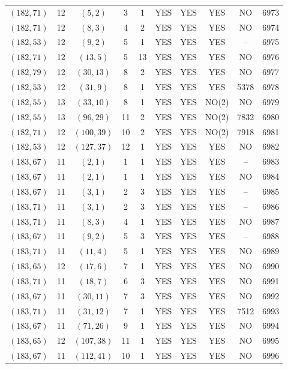 \begin{longtable}{|c|c|c|c|c|c|c|c|c|c|}
$(182, 71)$ & 12 & $(5, 2)$ & 3 & 1 & YES & YES & YES & NO & 6973\\
$(182, 71)$ & 12 & $(8, 3)$ & 4 & 2 & YES & YES & YES & NO & 6974\\
$(182, 53)$ & 12 & $(9, 2)$ & 5 & 1 & YES & YES & YES & -- & 6975\\
$(182, 71)$ & 12 & $(13, 5)$ & 5 & 13 & YES & YES & YES & NO & 6976\\
$(182, 79)$ & 12 & $(30, 13)$ & 8 & 2 & YES & YES & YES & NO & 6977\\
$(182, 53)$ & 12 & $(31, 9)$ & 8 & 1 & YES & YES & YES & 5378 & 6978\\
$(182, 55)$ & 13 & $(33, 10)$ & 8 & 1 & YES & YES & NO(2) & NO & 6979\\
$(182, 55)$ & 13 & $(96, 29)$ & 11 & 2 & YES & YES & NO(2) & 7832 & 6980\\
$(182, 71)$ & 12 & $(100, 39)$ & 10 & 2 & YES & YES & NO(2) & 7918 & 6981\\
$(182, 53)$ & 12 & $(127, 37)$ & 12 & 1 & YES & YES & YES & NO & 6982\\
$(183, 67)$ & 11 & $(2, 1)$ & 1 & 1 & YES & YES & YES & -- & 6983\\
$(183, 67)$ & 11 & $(2, 1)$ & 1 & 1 & YES & YES & YES & NO & 6984\\
$(183, 67)$ & 11 & $(3, 1)$ & 2 & 3 & YES & YES & YES & -- & 6985\\
$(183, 71)$ & 11 & $(3, 1)$ & 2 & 3 & YES & YES & YES & -- & 6986\\
$(183, 71)$ & 11 & $(8, 3)$ & 4 & 1 & YES & YES & YES & NO & 6987\\
$(183, 67)$ & 11 & $(9, 2)$ & 5 & 3 & YES & YES & YES & -- & 6988\\
$(183, 71)$ & 11 & $(11, 4)$ & 5 & 1 & YES & YES & YES & NO & 6989\\
$(183, 65)$ & 12 & $(17, 6)$ & 7 & 1 & YES & YES & YES & NO & 6990\\
$(183, 71)$ & 11 & $(18, 7)$ & 6 & 3 & YES & YES & YES & NO & 6991\\
$(183, 67)$ & 11 & $(30, 11)$ & 7 & 3 & YES & YES & YES & NO & 6992\\
$(183, 71)$ & 11 & $(31, 12)$ & 7 & 1 & YES & YES & YES & 7512 & 6993\\
$(183, 67)$ & 11 & $(71, 26)$ & 9 & 1 & YES & YES & YES & NO & 6994\\
$(183, 65)$ & 12 & $(107, 38)$ & 11 & 1 & YES & YES & YES & NO & 6995\\
$(183, 67)$ & 11 & $(112, 41)$ & 10 & 1 & YES & YES & YES & NO & 6996\\

\end{longtable}
